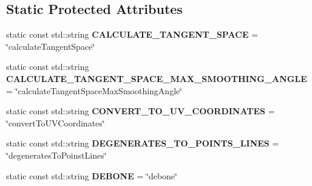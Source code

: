 \subsection*{Static Protected Attributes}
\begin{DoxyCompactItemize}
\item 
\hypertarget{classrepo_1_1manipulator_1_1modelconvertor_1_1_model_import_config_a141e61b65d0896d215463acb4a33cb42}{}static const std\+::string {\bfseries C\+A\+L\+C\+U\+L\+A\+T\+E\+\_\+\+T\+A\+N\+G\+E\+N\+T\+\_\+\+S\+P\+A\+C\+E} = \char`\"{}calculate\+Tangent\+Space\char`\"{}\label{classrepo_1_1manipulator_1_1modelconvertor_1_1_model_import_config_a141e61b65d0896d215463acb4a33cb42}

\item 
\hypertarget{classrepo_1_1manipulator_1_1modelconvertor_1_1_model_import_config_a7251d2f069376102f0d7d7ef5ecac72a}{}static const std\+::string {\bfseries C\+A\+L\+C\+U\+L\+A\+T\+E\+\_\+\+T\+A\+N\+G\+E\+N\+T\+\_\+\+S\+P\+A\+C\+E\+\_\+\+M\+A\+X\+\_\+\+S\+M\+O\+O\+T\+H\+I\+N\+G\+\_\+\+A\+N\+G\+L\+E} = \char`\"{}calculate\+Tangent\+Space\+Max\+Smoothing\+Angle\char`\"{}\label{classrepo_1_1manipulator_1_1modelconvertor_1_1_model_import_config_a7251d2f069376102f0d7d7ef5ecac72a}

\item 
\hypertarget{classrepo_1_1manipulator_1_1modelconvertor_1_1_model_import_config_adee6e7c8adddb7713334fa74161985ad}{}static const std\+::string {\bfseries C\+O\+N\+V\+E\+R\+T\+\_\+\+T\+O\+\_\+\+U\+V\+\_\+\+C\+O\+O\+R\+D\+I\+N\+A\+T\+E\+S} = \char`\"{}convert\+To\+U\+V\+Coordinates\char`\"{}\label{classrepo_1_1manipulator_1_1modelconvertor_1_1_model_import_config_adee6e7c8adddb7713334fa74161985ad}

\item 
\hypertarget{classrepo_1_1manipulator_1_1modelconvertor_1_1_model_import_config_a18e164f211203288e79dcaf46d697d7a}{}static const std\+::string {\bfseries D\+E\+G\+E\+N\+E\+R\+A\+T\+E\+S\+\_\+\+T\+O\+\_\+\+P\+O\+I\+N\+T\+S\+\_\+\+L\+I\+N\+E\+S} = \char`\"{}degenerates\+To\+Poinst\+Lines\char`\"{}\label{classrepo_1_1manipulator_1_1modelconvertor_1_1_model_import_config_a18e164f211203288e79dcaf46d697d7a}

\item 
\hypertarget{classrepo_1_1manipulator_1_1modelconvertor_1_1_model_import_config_adea8d96a90d0d2026a9d8e2a2543cf03}{}static const std\+::string {\bfseries D\+E\+B\+O\+N\+E} = \char`\"{}debone\char`\"{}\label{classrepo_1_1manipulator_1_1modelconvertor_1_1_model_import_config_adea8d96a90d0d2026a9d8e2a2543cf03}


\end{DoxyCompactItemize}
